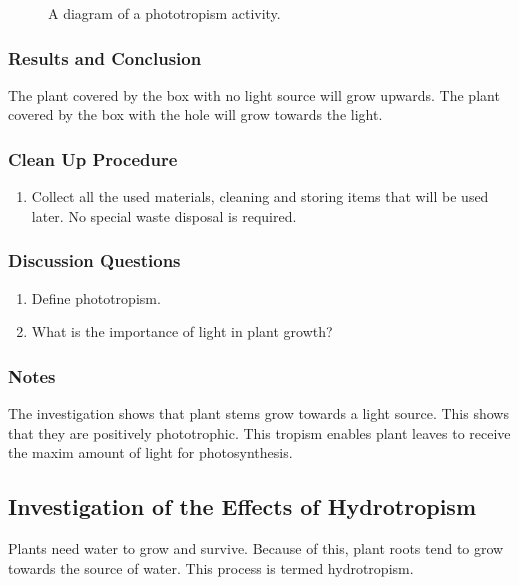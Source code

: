 \begin{figure}[h]
\begin{center}
\def\svgwidth{8cm}

\caption{A diagram of a phototropism activity.}
\label{fig:phototropism}
\end{center}
\end{figure}

\subsubsection*{Results and Conclusion}
The plant covered by the box with no light source will grow upwards. The plant covered by the box with the hole will grow towards the light.

\subsubsection*{Clean Up Procedure}
\begin{enumerate}
\item{Collect all the used materials, cleaning and storing items that will be used later. No special waste disposal is required.}
\end{enumerate}

\subsubsection*{Discussion Questions}
\begin{enumerate}
\item{Define phototropism.}
\item{What is the importance of light in plant growth?}
\end{enumerate}

\subsubsection*{Notes}
The investigation shows that plant stems grow towards a light source.  This shows that they are positively phototrophic. This tropism enables plant leaves to receive the maxim amount of light for photosynthesis.


\subsection{Investigation of the Effects of Hydrotropism}
Plants need water to grow and survive. Because of this, plant roots tend to grow towards the source of water. This process is termed hydrotropism.

